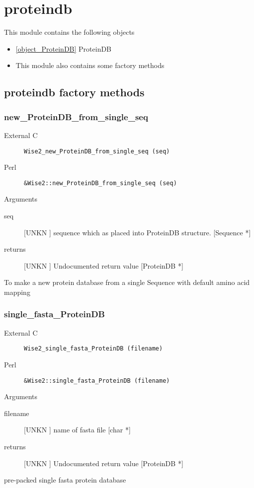 \section{proteindb}
\label{module_proteindb}
This module contains the following objects

\begin{itemize}
\item \ref{object_ProteinDB} ProteinDB

\item This module also contains some factory methods
\end{itemize}
\subsection{proteindb factory methods}
\subsubsection{new_ProteinDB_from_single_seq}
\begin{description}
\item[External C] {\tt Wise2_new_ProteinDB_from_single_seq (seq)}
\item[Perl] {\tt &Wise2::new_ProteinDB_from_single_seq (seq)}

\end{description}
Arguments
\begin{description}
\item[seq] [UNKN ] sequence which as placed into ProteinDB structure. [Sequence *]
\item[returns] [UNKN ] Undocumented return value [ProteinDB *]
\end{description}
To make a new protein database
from a single Sequence with default amino acid mapping


\subsubsection{single_fasta_ProteinDB}
\begin{description}
\item[External C] {\tt Wise2_single_fasta_ProteinDB (filename)}
\item[Perl] {\tt &Wise2::single_fasta_ProteinDB (filename)}

\end{description}
Arguments
\begin{description}
\item[filename] [UNKN ] name of fasta file [char *]
\item[returns] [UNKN ] Undocumented return value [ProteinDB *]
\end{description}
pre-packed single fasta protein database




